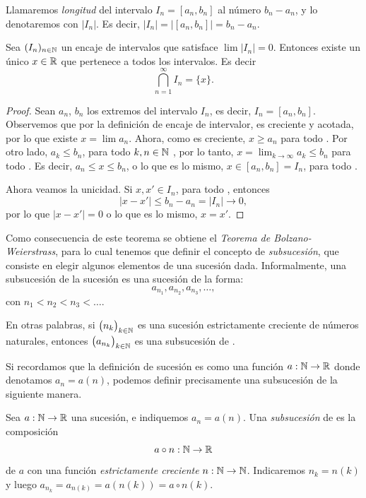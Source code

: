 Llamaremos \emph{longitud} del intervalo $I_n = [a_n,b_n]$ al número $b_n-a_n$, y lo denotaremos con $|I_n|$. Es decir, $|I_n| = |[a_n,b_n]| = b_n-a_n$.

\begin{theorem}
    Sea $(I_n)_{n\in\mathbb{N}}$ un encaje de intervalos que satisface $\lim |I_n| = 0$. Entonces existe un único $x \in \mathbb{R}$ que pertenece a todos los intervalos. Es decir
    \[
    \bigcap_{n=1}^\infty I_n = \{ x \}.
    \]
\end{theorem}

\begin{proof}
    Sean $a_n$, $b_n$ los extremos del intervalo $I_n$, es decir, $I_n=[a_n,b_n]$.
    Observemos que por la definición de encaje de intervalor, \sucan es creciente y acotada, por lo que existe $x=\lim a_n$. Ahora, como \sucan es creciente, $x \ge a_n$ para todo \niN.
    Por otro lado, $a_k \le b_n$, para todo $k,n\in\mathbb{N}$ , por lo tanto, $x 
    = \lim_{k\to\infty} a_k \le b_n$ para todo \niN. Es decir, $a_n\le x \le b_n$, o lo que es lo mismo, $x\in [a_n,b_n]=I_n$, para todo \niN.

    Ahora veamos la unicidad. Si $x,x' \in I_n$, para todo \niN, entonces 
    \[
    |x-x'| \le b_n-a_n = |I_n| \to 0,
    \]
    por lo que $|x-x'|=0$ o lo que es lo mismo, $x=x'$.
\end{proof}

Como consecuencia de este teorema se obtiene el \emph{Teorema de Bolzano-Weierstrass}, para lo cual tenemos que definir el concepto de \emph{subsucesión}, que consiste en elegir algunos elementos de una sucesión dada. Informalmente, una subsucesión de la sucesión \sucan es una sucesión de la forma:
    \[
    a_{n_1}, a_{n_2}, a_{n_3}, \dots,
    \]
    con $n_1<n_2<n_3<\dots$.

En otras palabras, si $\big(n_k\big)_{k\in\mathbb{N}}$ es una sucesión estrictamente creciente de números naturales, entonces $\big(a_{n_k}\big)_{k\in\mathbb{N}}$ es una subsucesión de \sucan.

Si recordamos que la definición de sucesión \sucan es como una función $a:\mathbb{N}\to\mathbb{R}$ donde denotamos $a_n = a(n)$, podemos definir precisamente una subsucesión de la siguiente manera.

\begin{definition}
Sea $a:\mathbb{N}\to\mathbb{R}$ una sucesión, e indiquemos $a_n=a(n)$. Una \emph{subsucesión} de \sucan es la composición
\[
a \circ n : \mathbb{N} \to \mathbb{R}
\]
de $a$ con una función \emph{estrictamente creciente} $n:\mathbb{N} \to \mathbb{N}$. Indicaremos $n_k = n(k)$ y luego $a_{n_k} = a_{n(k)} = a(n(k)) = a\circ n(k)$.
\end{definition}

